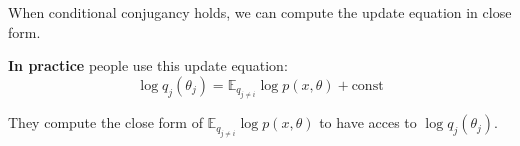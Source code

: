 When conditional conjugancy holds, we can compute the update equation in close form. 

\vspace{0.3cm}

\textbf{In practice} people use this update equation:
\begin{equation}
 \log q_j(\theta_j) = \mathbb{E}_{q_{j\neq i}} \log p(x,\theta) + \text{const}
\end{equation}

They compute the close form of $\mathbb{E}_{q_{j\neq i}} \log p(x,\theta)$ to have acces to $\log q_j(\theta_j)$.






 
 

